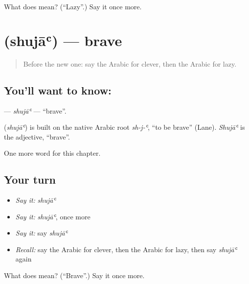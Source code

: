 \begin{tcolorbox}[breakable,colback=teal!4,colframe=teal!35!black,title={Before you move on}]
What does  mean? (\textquotedblleft{}Lazy\textquotedblright{}.) Say it once more.
\end{tcolorbox}
\section[\texorpdfstring{\ar{شجاع} (shujāʿ)}{شجاع (shujāʿ)}]{ (shujāʿ) — brave}

\label{lesson:AR-C153-shuja}



\begin{quote}
Before the new one: say the Arabic for clever, then the Arabic for lazy.
\end{quote}

\subsection*{You'll want to know: }
\textbf{} — \emph{shujāʿ} — \textquotedblleft{}brave\textquotedblright{}.

\begin{cousinweb}
\textbf{} (\emph{shujāʿ}) is built on the native Arabic root \emph{sh-j-ʿ}, \textquotedblleft{}to be brave\textquotedblright{} (Lane). \emph{Shujāʿ} is the adjective, \textquotedblleft{}brave\textquotedblright{}.
\end{cousinweb}

\begin{grammarlens}[title={What you've built}]
One more word for this chapter.
\end{grammarlens}

\subsection*{Your turn}
\begin{itemize}
\raggedright
  \item \emph{Say it:} \emph{shujāʿ}
  \item \emph{Say it:} \emph{shujāʿ}, once more
  \item \emph{Say it:} say \emph{shujāʿ}
  \item \emph{Recall:} say the Arabic for clever, then the Arabic for lazy, then say \emph{shujāʿ} again
\end{itemize}

\begin{tcolorbox}[breakable,colback=teal!4,colframe=teal!35!black,title={Before you move on}]
What does  mean? (\textquotedblleft{}Brave\textquotedblright{}.) Say it once more.
\end{tcolorbox}
